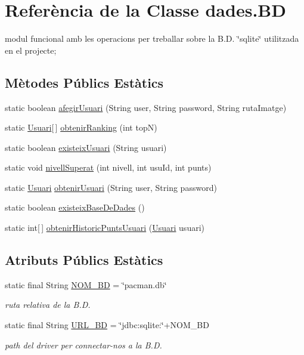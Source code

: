 \hypertarget{classdades_1_1_b_d}{\section{Referència de la Classe dades.\+B\+D}
\label{classdades_1_1_b_d}
}


modul funcional amb les operacions per treballar sobre la B.\+D. \char`\"{}sqlite\char`\"{} utilitzada en el projecte;  


\subsection*{Mètodes Públics Estàtics}
\begin{DoxyCompactItemize}
\item 
static boolean \hyperlink{classdades_1_1_b_d_aebeb79a5b559c404967e7af4a51fbe07}{afegir\+Usuari} (String user, String password, String ruta\+Imatge)
\item 
static \hyperlink{classlogica_1_1_usuari}{Usuari}\mbox{[}$\,$\mbox{]} \hyperlink{classdades_1_1_b_d_adecdaacdefdcf4c26e307c3c6b13cbca}{obtenir\+Ranking} (int top\+N)
\item 
static boolean \hyperlink{classdades_1_1_b_d_ad5629c3a6ea389ca0ec6fe6f71f49e5a}{existeix\+Usuari} (String usuari)
\item 
static void \hyperlink{classdades_1_1_b_d_aee65076de634577866799db9ea3315b8}{nivell\+Superat} (int nivell, int usu\+Id, int punts)
\item 
static \hyperlink{classlogica_1_1_usuari}{Usuari} \hyperlink{classdades_1_1_b_d_ae8a0bfc4f5c75e66fd6ba1a6c9568b07}{obtenir\+Usuari} (String user, String password)
\item 
static boolean \hyperlink{classdades_1_1_b_d_a60b00af9b05e556fd66b8dbf69e012cd}{existeix\+Base\+De\+Dades} ()
\item 
static int\mbox{[}$\,$\mbox{]} \hyperlink{classdades_1_1_b_d_a9820e3cbf955816cc7e4e8aabb5d313b}{obtenir\+Historic\+Punts\+Usuari} (\hyperlink{classlogica_1_1_usuari}{Usuari} usuari)
\end{DoxyCompactItemize}
\subsection*{Atributs Públics Estàtics}
\begin{DoxyCompactItemize}
\item 
static final String \hyperlink{classdades_1_1_b_d_a0244ade6a6066ad9f59f8f8e9b2e034e}{N\+O\+M\+\_\+\+B\+D} = \char`\"{}pacman.\+db\char`\"{}
\begin{DoxyCompactList}\small\item\em ruta relativa de la B.\+D. \end{DoxyCompactList}\item 
static final String \hyperlink{classdades_1_1_b_d_abc83c541acdcd0be2ae8a33daa753077}{U\+R\+L\+\_\+\+B\+D} = \char`\"{}jdbc\+:sqlite\+:\char`\"{}+N\+O\+M\+\_\+\+B\+D
\begin{DoxyCompactList}\small\item\em path del driver per connectar-\/nos a la B.\+D. \end{DoxyCompactList}\end{DoxyCompactItemize}


